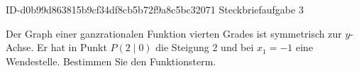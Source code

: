 \begin{exercise}
      {ID-d0b99d863815b9cf34df8cb5b72f9a8c5bc32071}
      {Steckbriefaufgabe 3}
  \ifproblem\problem\par
    Der Graph einer ganzrationalen Funktion vierten Grades ist symmetrisch
    zur $y$-Achse. Er hat in Punkt $P(\num{2}\mid\num{0})$ die Steigung
    \num{2} und bei $x_1=\num{-1}$ eine Wendestelle. Bestimmen Sie den
    Funktionsterm.
  \fi
\end{exercise}
